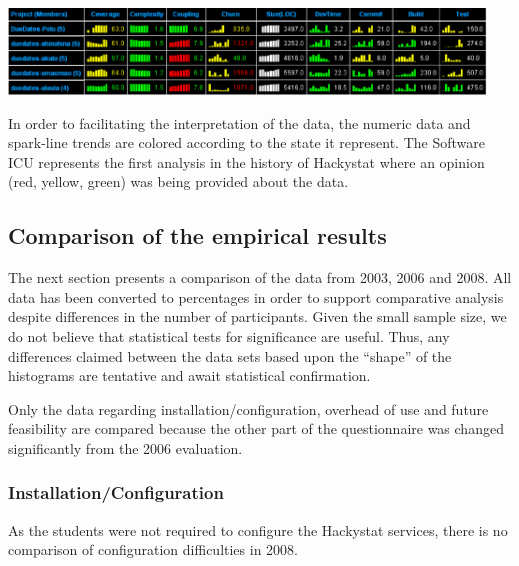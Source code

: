 \documentclass[11pt]{article}
\begin{document}
\includegraphics[width=0.95\textwidth]{portfolio-2008}

In order to facilitating the interpretation of the data, the numeric data and spark-line trends are colored according to the state it represent. The Software ICU represents the first analysis in the history of Hackystat where an opinion (red, yellow, green) was being provided about the data. 

\subsection {Comparison of the empirical results}
The next section presents a comparison of the data from 2003, 2006 and 2008. All data has been converted to percentages in order to support comparative analysis despite differences in the number of participants. Given the small sample size, we do not believe that statistical tests for significance are useful. Thus, any differences claimed between the data sets based upon the ``shape'' of the histograms are tentative and await statistical confirmation. 

Only the data regarding installation/configuration, overhead of use and future feasibility are compared because the other part of the questionnaire was changed significantly from the 2006 evaluation.

\subsubsection {Installation/Configuration}
As the students were not required to configure the Hackystat services, there is no comparison of configuration difficulties in 2008.
\end{document}
